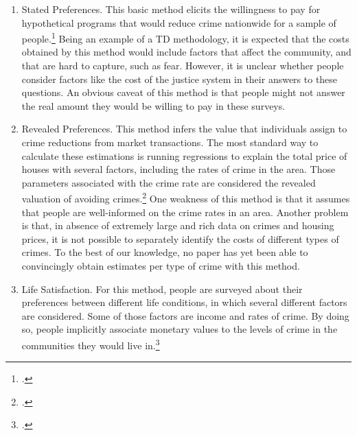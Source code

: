 \begin{enumerate}
\item Stated Preferences. This basic method elicits the willingness to pay for hypothetical programs that would reduce crime nationwide for a sample of people.\footnote{\citet{Cohen_Rust_etal_2004_Criminology}.} Being an example of a TD methodology, it is expected that the costs obtained by this method would include factors that affect the community, and that are hard to capture, such as fear. However, it is unclear whether people consider factors like the cost of the justice system in their answers to these questions. An obvious caveat of this method is that people might not answer the real amount they would be willing to pay in these surveys.
\item Revealed Preferences. This method infers the value that individuals assign to crime reductions from market transactions. The most standard way to calculate these estimations is running regressions to explain the total price of houses with several factors, including the rates of crime in the area. Those parameters associated with the crime rate are considered the revealed valuation of avoiding crimes.\footnote{\citet{Thaler_1978_Value-Crime-Control}.} One weakness of this method is that it assumes that people are well-informed on the crime rates in an area. Another problem is that, in absence of extremely large and rich data on crimes and housing prices, it is not possible to separately identify the costs of different types of crimes. To the best of our knowledge, no paper has yet been able to convincingly obtain estimates per type of crime with this method.
\item Life Satisfaction. For this method, people are surveyed about their preferences between different life conditions, in which several different factors are considered. Some of those factors are income and rates of crime. By doing so, people implicitly associate monetary values to the levels of crime in the communities they would live in.\footnote{\citet{ Moore_etal_2006_Cost-of-Fear,Moore_2006_Value-Reducing-Fear}.}
\end{enumerate}

